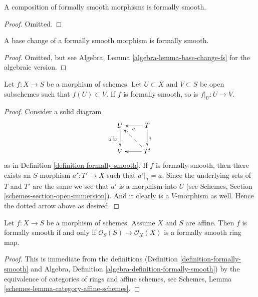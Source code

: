 \begin{lemma}
\label{lemma-composition-formally-smooth}
A composition of formally smooth morphisms is formally smooth.
\end{lemma}

\begin{proof}
Omitted.
\end{proof}

\begin{lemma}
\label{lemma-base-change-formally-smooth}
A base change of a formally smooth morphism is formally smooth.
\end{lemma}

\begin{proof}
Omitted, but see Algebra, Lemma \ref{algebra-lemma-base-change-fs}
for the algebraic version.
\end{proof}

\begin{lemma}
\label{lemma-formally-smooth-on-opens}
Let $f : X \to S$ be a morphism of schemes.
Let $U \subset X$ and $V \subset S$ be open subschemes such that
$f(U) \subset V$. If $f$ is formally smooth, so is $f|_U : U \to V$.
\end{lemma}

\begin{proof}
Consider a solid diagram
$$
\xymatrix{
U \ar[d]_{f|_U} & T \ar[d]^i \ar[l]^a \\
V & T' \ar[l] \ar@{-->}[lu]
}
$$
as in Definition \ref{definition-formally-smooth}. If $f$ is formally
smooth, then there exists an $S$-morphism $a' : T' \to X$ such that
$a'|_T = a$. Since the underlying sets of $T$ and $T'$ are the same
we see that $a'$ is a morphism into $U$ (see Schemes, Section
\ref{schemes-section-open-immersion}). And it clearly is a $V$-morphism
as well. Hence the dotted arrow above as desired.
\end{proof}

\begin{lemma}
\label{lemma-affine-formally-smooth}
Let $f : X \to S$ be a morphism of schemes.
Assume $X$ and $S$ are affine.
Then $f$ is formally smooth if and only if
$\mathcal{O}_S(S) \to \mathcal{O}_X(X)$ is a formally smooth
ring map.
\end{lemma}

\begin{proof}
This is immediate from the definitions
(Definition \ref{definition-formally-smooth} and
Algebra, Definition \ref{algebra-definition-formally-smooth})
by the equivalence of categories of rings and affine schemes,
see
Schemes, Lemma \ref{schemes-lemma-category-affine-schemes}.
\end{proof}

